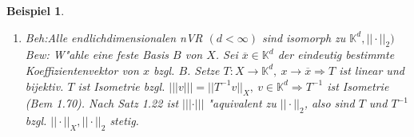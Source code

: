 \documentclass[a4paper,11pt]{book}
\newcommand{\K}{{\mathbb K}}
\newtheorem{Bsp}[Def]{Beispiel}
\theoremstyle{nonumberplain}
\begin{document}
\begin{Bsp}
\begin{enumerate}
\item[e)] \emph{Beh:}Alle endlichdimensionalen nVR $(d < \infty)$ sind isomorph zu $\K^d,||\cdot||_2)$\\
\emph{Bew:} W"ahle eine feste Basis $B$ von $X$. Sei $\overline{x} \in \K^d$ der eindeutig bestimmte Koeffizientenvektor von $x$ bzgl. $B$. Setze $T: X \rightarrow \K^d,\ x \rightarrow \overline{x} \Rightarrow T$ ist linear und bijektiv. $T$ ist Isometrie bzgl. $|||v||| = ||T^{-1}v||_X,\ v \in \K^d \Longrightarrow T^{-1}$ ist Isometrie (Bem 1.70). Nach Satz 1.22 ist $|||\cdot|||$ "aquivalent zu $||\cdot||_2$, also sind $T$ und $T^{-1}$ bzgl. $||\cdot||_X, ||\cdot||_2$ stetig.
\end{enumerate}
\end{Bsp}
\end{document}
